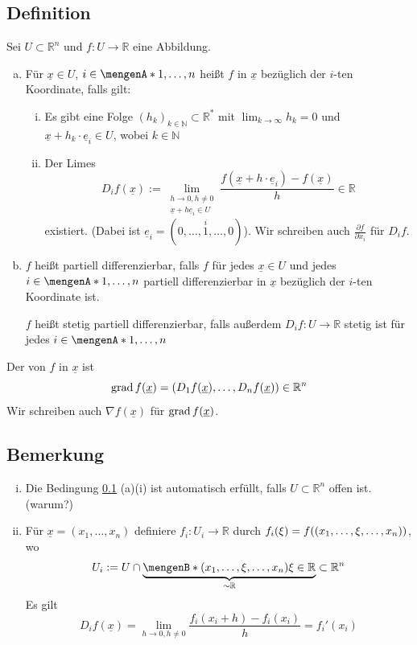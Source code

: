 \subsection[Definition: Partielle Differenzierbarkeit]{Definition} %
\label{sub:61}
Sei $U \subset \mathds{R}^n$ und $f : U \to \mathds{R}$ eine Abbildung. 
\begin{enumerate}[a)]
	\item Für $\underline{x} \in U $, $i \in \set{1,\ldots,n}$ heißt $f$  in $\underline{x} $ bezüglich der $i$-ten Koordinate, falls gilt:
	\begin{enumerate}[(i)]
		\item Es gibt eine Folge $(h_k)_{k \in \mathds{N}} \subset \mathds{R}^*$ mit $\lim_{ k \to \infty} h_k = 0$ und $\underline{x} + h_k \cdot \underline{e}_i \in U $,
		wobei $k \in \mathds{N}$
		\item Der Limes 
		\[
			D_i f(\underline{x}) := \lim_{ \substack{h \to 0, h \not= 0 \\ \underline{x} + h \underline{e}_i \in U  }}  \frac{f( \underline{x} + h \cdot\underline{e}_i) - 
			f(\underline{x} )}{h} \in \mathds{R}
		\]
		existiert. (Dabei ist $\underline{e}_i = ( 0, \ldots , \stackrel{i}{1}, \ldots , 0)$). Wir schreiben auch $\frac{\partial f}{\partial x_i} $ für $D_i f$.
	\end{enumerate}
	\item $f$ heißt partiell differenzierbar, falls $f$ für jedes $\underline{x} \in U $ und jedes $i \in \set{1, \ldots , n} $ partiell differenzierbar in $\underline{x} $
	bezüglich der $i$-ten Koordinate ist.
	
	$f$ heißt stetig partiell differenzierbar, falls außerdem $D_i f : U  \to \mathds{R}$ stetig ist für jedes $i \in \set{1, \ldots , n} $
\end{enumerate}
Der  von $f$ in $\underline{x}$ ist 
\[
	\grad f(\underline{x}) = \enbrace*{ D_1 f(\underline{x}), \ldots , D_n f(\underline{x}) } \in \mathds{R}^n 
\]
Wir schreiben auch $\nabla f(\underline{x})$ für $\grad f(\underline{x} )$.

\subsection[Bemerkung zur partiellen Differenzierbarkeit]{Bemerkung} %
\label{sub:62}
\begin{enumerate}[(i)]
	\item Die Bedingung \ref{sub:61} (a)(i) ist automatisch erfüllt, falls $U \subset \mathds{R}^n$ offen ist. \hfill (warum?)
	\item Für $\underline{x}= (x_1, \ldots , x_n) $ definiere $f_i : U_i \to \mathds{R}$ durch $f_i(\xi) = f \enbrace*{ (x_1, \ldots , \xi, \ldots , x_n)} $, wo 
	\[
		U_i := U \cap \underbrace{\set[(x_1, \ldots , \xi, \ldots , x_n)]{\xi \in \mathds{R}}}_{\sim \mathds{R}}  \subset \mathds{R}^n
	\]
	Es gilt
	\[
		D_i f (\underline{x} ) =  \lim_{ h \to 0, h \not= 0} \frac{f_i (x_i +h) - f_i(x_i)}{h}  = f_i' (x_i)
	\]
\end{enumerate}

